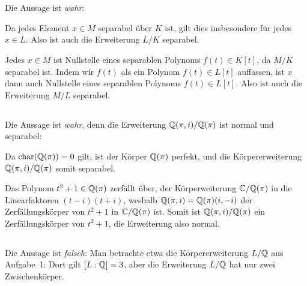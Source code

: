 \section{}





\subsection{}

Die Aussage ist \emph{wahr}:

Da jedes Element $x \in M$ separabel über $K$ ist, gilt dies insbesondere für jedes $x \in L$.
Also ist auch die Erweiterung $L/K$ separabel.

Jedes $x \in M$ ist Nullstelle eines separablen Polynoms $f(t) \in K[t]$, da $M/K$ separabel ist.
Indem wir $f(t)$ als ein Polynom $f(t) \in L[t]$ auffassen, ist $x$ dann auch Nullstelle eines separablen Polynoms $f(t) \in L[t]$.
Also ist auch die Erweiterung $M/L$ separabel.





\subsection{}

Die Aussage ist \emph{wahr}, denn die Erweiterung $\mathbb{Q}(\pi,i)/\mathbb{Q}(\pi)$ ist normal und separabel:

Da $\operatorname{char}(\mathbb{Q}(\pi)) = 0$ gilt, ist der Körper $\mathbb{Q}(\pi)$ perfekt, und die Körpererweiterung $\mathbb{Q}(\pi,i)/\mathbb{Q}(\pi)$ somit separabel.

Das Polynom $t^2 + 1 \in \mathbb{Q}(\pi)$ zerfällt über, der Körperweiterung $\mathbb{C}/\mathbb{Q}(\pi)$ in die Linearfaktoren $(t-i)(t+i)$, weshalb $\mathbb{Q}(\pi,i) = \mathbb{Q}(\pi)(i,-i)$ der Zerfällungskörper von $t^2 + 1$ in $\mathbb{C}/\mathbb{Q}(\pi)$ ist.
Somit ist $\mathbb{Q}(\pi,i)/\mathbb{Q}(\pi)$ ein Zerfällungskörper von $t^2 + 1$, die Erweiterung also normal.





\subsection{}

Die Aussage ist \emph{falsch}:
Man betrachte etwa die Körpererweiterung $L/\mathbb{Q}$ aus Aufgabe~1:
Dort gilt $[L : \mathbb{Q}] = 3$, aber die Erweiterung $L/\mathbb{Q}$ hat nur zwei Zwischenkörper.






